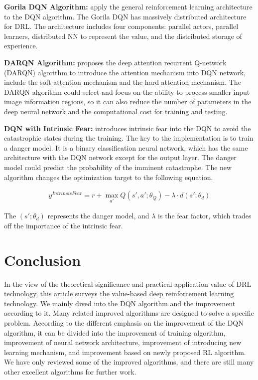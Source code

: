\documentclass{article}
\begin{document}
{\bf Gorila DQN Algorithm:}
\citep{nair2015massively} apply the general reinforcement learning architecture to the DQN algorithm. The Gorila DQN has massively distributed architecture for DRL. The architecture includes four components: parallel actors, parallel learners, distributed NN to represent the value, and the distributed storage of experience.

{\bf DARQN Algorithm:}
\citep{sorokin2015deep} proposes the deep attention recurrent Q-network (DARQN) algorithm to introduce the attention mechanism into DQN network, include the soft attention mechanism and the hard attention mechanism. The DARQN algorithm could select and focus on the ability to process smaller input image information regions, so it can also reduce the number of parameters in the deep neural network and the computational cost for training and testing.

{\bf DQN with Intrinsic Fear:}
\citep{lipton2016combating} introduces intrinsic fear into the DQN to avoid the catastrophic states during the training. The key to the implementation is to train a danger model. It is a binary classification neural network, which has the same architecture with the DQN network except for the output layer. The danger model could predict the probability of the imminent catastrophe. The new algorithm changes the optimization target to the following equation.

\begin{align}
y^{IntrinsicFear}=r+\operatorname*{max}_{a'}Q(s',a';\theta_Q)-\lambda\cdot d(s';\theta_d)
\end{align}

The $(s';\theta_d)$ represents the danger model, and $\lambda$ is the fear factor, which trades off the importance of the intrinsic fear.
%
\section{Conclusion}
\label{sec:Conclusion}
In the view of the theoretical significance and practical application value of DRL technology, this article surveys the value-based deep reinforcement learning technology. We mainly dived into the DQN algorithm and the improvement according to it. Many related improved algorithms are designed to solve a specific problem. According to the different emphasis on the improvement of the DQN algorithm, it can be divided into the improvement of training algorithm, improvement of neural network architecture, improvement of introducing new learning mechanism, and improvement based on newly proposed RL algorithm. We have only reviewed some of the improved algorithms, and there are still many other excellent algorithms for further work.
%


%

\newpage
\appendix
 
%
\end{document}
